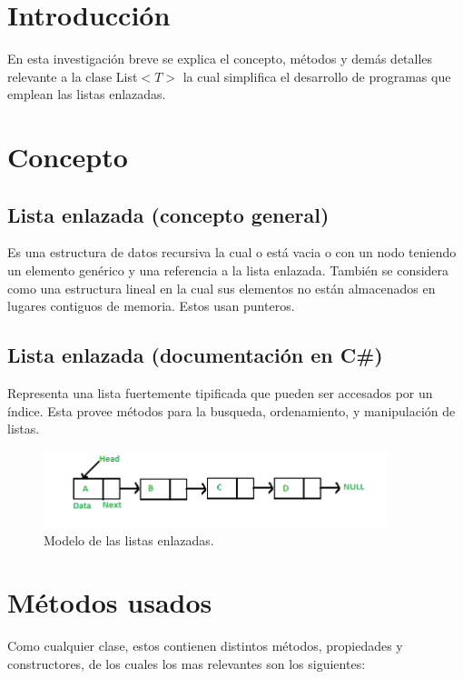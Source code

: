 \documentclass[letterpaper, 12pt]{article}
\begin{document}
        \newpage
        \begin{justify}
            \setcounter{page}{1}
            \thispagestyle{fancy}
            \section{Introducción}
            En esta investigación breve se explica el concepto, métodos y demás detalles relevante a la clase List\(<\!T\!>\) 
            la cual simplifica el desarrollo de programas que emplean las listas enlazadas.
            \section{Concepto}
            \subsection{Lista enlazada (concepto general)} Es una estructura de datos recursiva la cual o está vacia o con un nodo teniendo un elemento genérico
            y una referencia a la lista enlazada. También se considera como una estructura lineal en la cual sus elementos no están almacenados en lugares contiguos de memoria.
            Estos usan punteros.
            \subsection{Lista enlazada (documentación en C\#)} 
            Representa una lista fuertemente tipificada que pueden ser accesados por un índice. Esta provee métodos para la busqueda, ordenamiento, y manipulación de listas.
            \newline
            \begin{figure}[H]
                \centering
                \includegraphics[width=10cm]{Linkedlist.png}
                \caption{Modelo de las listas enlazadas.}
                \label{fig:linked}
            \end{figure}
            \section{Métodos usados}
            Como cualquier clase, estos contienen distintos métodos, propiedades y constructores, de los cuales los mas relevantes son los siguientes:

\end{justify}
\end{document}
